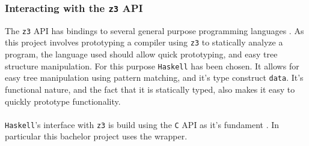\subsubsection{Interacting with the \texttt{z3} API} \label{sec:z3interaction}
The \texttt{z3} API has bindings to several general purpose programming languages \cite{z3:api}.
As this project involves prototyping a compiler using \texttt{z3} to statically analyze a program,
the language used should allow quick prototyping, and easy tree structure manipulation. For this
purpose \texttt{Haskell} has been chosen. It allows for easy tree manipulation using pattern
matching, and it's type construct \texttt{data}. It's functional nature, and the fact that it is
statically typed, also makes it easy to quickly prototype functionality.
\\
\\
\texttt{Haskell}'s interface with \texttt{z3} is build using the \texttt{C} API as it's fundament
\cite{z3:api2}. In particular this bachelor project uses the  wrapper.


